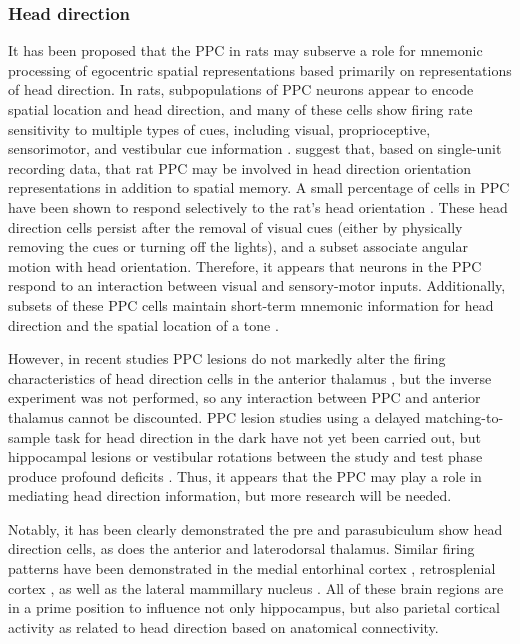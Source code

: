 \documentclass[doc, longtable]{apa6}
\begin{document}
\subsubsection{Head direction}
It has been proposed that the PPC in rats may subserve a role for mnemonic processing of egocentric spatial representations based primarily on representations of head direction. In rats, subpopulations of PPC neurons appear to encode spatial location and head direction, and many of these cells show firing rate sensitivity to multiple types of cues, including visual, proprioceptive, sensorimotor, and vestibular cue information \parencite{Chen1994a,Chen1994, McNaughton1991a}. \textcite{chen1998head} suggest that, based on single-unit recording data, that rat PPC may be involved in head direction orientation representations in addition to spatial memory. A small percentage of cells in PPC have been shown to respond selectively to the rat's head orientation \parencite{Chen1994a,Chen1994}. These head direction cells persist after the removal of visual cues (either by physically removing the cues or turning off the lights), and a subset associate angular motion with head orientation. Therefore, it appears that neurons in the PPC respond to an interaction between visual and sensory-motor inputs. Additionally, subsets of these PPC cells maintain short-term mnemonic information for head direction and the spatial location of a tone \parencite{Nakamura1996a}. 

However, in recent studies PPC lesions do not markedly alter the firing characteristics of head direction cells in the anterior thalamus \parencite{Calton2008a}, but the inverse experiment was not performed, so any interaction between PPC and anterior thalamus cannot be discounted. PPC lesion studies using a delayed matching-to-sample task for head direction in the dark have not yet been carried out, but hippocampal lesions or vestibular rotations between the study and test phase produce profound deficits \parencite{DeCoteau2004a}. Thus, it appears that the PPC may play a role in mediating head direction information, but more research will be needed. 

Notably, it has been clearly demonstrated the pre and parasubiculum show head direction cells, as does the anterior and laterodorsal thalamus. Similar firing patterns have been demonstrated in the medial entorhinal cortex \parencite{Giocomo2014a}, retrosplenial cortex \parencite{cho2001head, Chen1994}, as well as the lateral mammillary nucleus \parencite{Blair1998a}. All of these brain regions are in a prime position to influence not only hippocampus, but also parietal cortical activity as related to head direction based on anatomical connectivity. 
\end{document}
